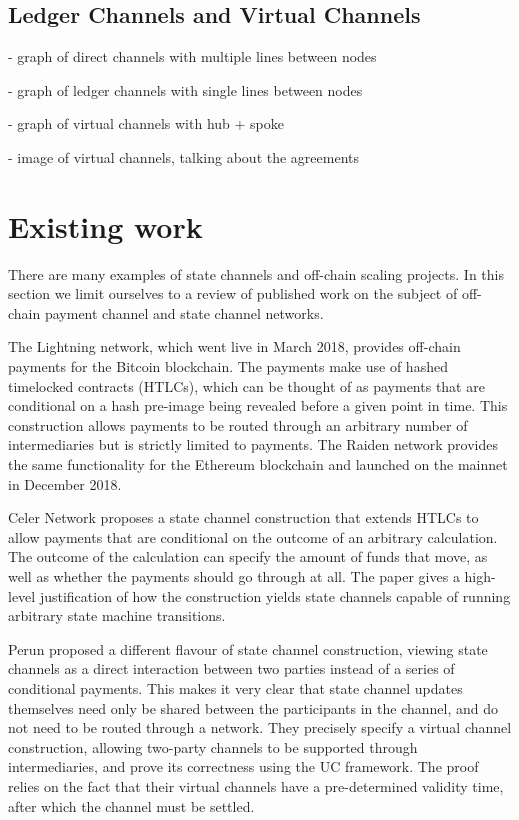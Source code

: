 \documentclass{article}
\begin{document}
\subsection{Ledger Channels and Virtual Channels}

- graph of direct channels with multiple lines between nodes

- graph of ledger channels with single lines between nodes

- graph of virtual channels with hub + spoke

- image of virtual channels, talking about the agreements

\section{Existing work}

There are many examples of state channels and off-chain scaling projects. In this section we limit ourselves to a review of published work on the subject of off-chain payment channel and state channel networks.

The Lightning network, which went live in March 2018, provides off-chain payments for the Bitcoin blockchain.
The payments make use of hashed timelocked contracts (HTLCs), which can be thought of as payments that are conditional on a hash pre-image being revealed before a given point in time.
This construction allows payments to be routed through an arbitrary number of intermediaries but is strictly limited to payments.
The Raiden network provides the same functionality for the Ethereum blockchain and launched on the mainnet in December 2018.

Celer Network proposes a state channel construction that extends HTLCs to allow payments that are conditional on the outcome of an arbitrary calculation.
The outcome of the calculation can specify the amount of funds that move, as well as whether the payments should go through at all.
The paper gives a high-level justification of how the construction yields state channels capable of running arbitrary state machine transitions.

Perun proposed a different flavour of state channel construction, viewing state channels as a direct interaction between two parties instead of a series of conditional payments.
This makes it very clear that state channel updates themselves need only be shared between the participants in the channel, and do not need to be routed through a network.
They precisely specify a virtual channel construction, allowing two-party channels to be supported through intermediaries, and prove its correctness using the UC framework.
The proof relies on the fact that their virtual channels have a pre-determined validity time, after which the channel must be settled.
\end{document}
